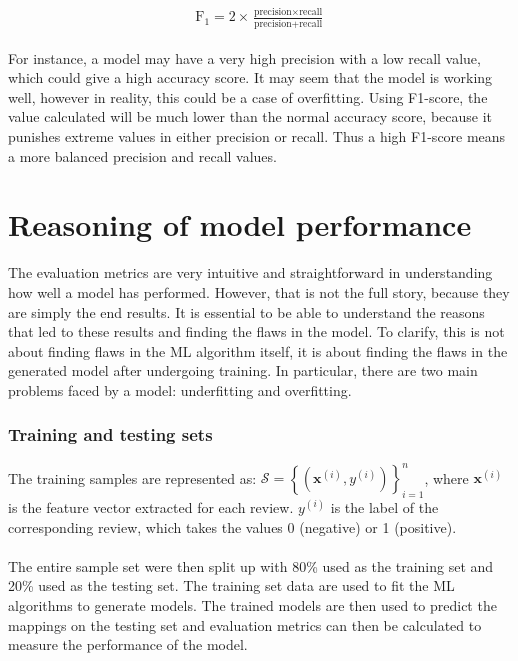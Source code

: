 \documentclass[a4paper]{report}
\begin{document}
{{\begin{eqnarray*}
    \begin{aligned}
        \operatorname{F_{1}}=2 \times \frac{\text{precision} \times \text{recall}}{\text{precision} + \text{recall}}
    \end{aligned}
\end{eqnarray*}

\noindent
For instance, a model may have a very high precision with a low recall value, which could give a high accuracy score. It may seem that the model is working well, however in reality, this could be a case of overfitting. Using F1-score, the value calculated will be much lower than the normal accuracy score, because it punishes extreme values in either precision or recall. Thus a high F1-score means a more balanced precision and recall values.

\section{Reasoning of model performance}
The evaluation metrics are very intuitive and straightforward in understanding how well a model has performed. However, that is not the full story, because they are simply the end results. It is essential to be able to understand the reasons that led to these results and finding the flaws in the model. To clarify, this is not about finding flaws in the ML algorithm itself, it is about finding the flaws in the generated model after undergoing training. In particular, there are two main problems faced by a model: underfitting and overfitting.

\subsubsection{Training and testing sets}
The training samples are represented as:
\(\mathcal{S}=\left\{\left(\mathbf{x}^{(i)}, y^{(i)}\right)\right\}_{i=1}^{n}\), where \(\mathbf{x}^{(i)}\) is the feature vector extracted for each review. \(y^{(i)}\) is the label of the corresponding review, which takes the values 0 (negative) or 1 (positive).
\\\\
The entire sample set were then split up with 80\% used as the training set and 20\% used as the testing set. The training set data are used to fit the ML algorithms to generate models. The trained models are then used to predict the mappings on the testing set and evaluation metrics can then be calculated to measure the performance of the model.

}}
\end{document}
